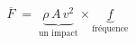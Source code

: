 \documentclass[preview]{standalone}
\begin{document}
\begin{align*}
\overline{F} \;=\; \underbrace{\rho\,A\,v^2}_{\text{un impact}} \times \underbrace{f}_{\text{fr\'equence}}
\end{align*}
\end{document}
